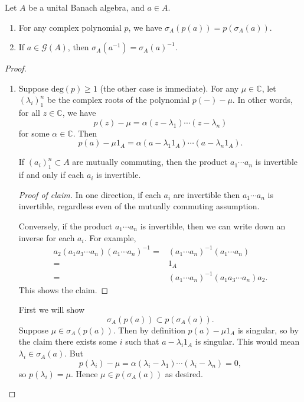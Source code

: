 \documentclass[12pt]{article}
\begin{document}
\begin{proposition}
	Let $A$ be a unital Banach algebra, and $a\in A$.
	\begin{enumerate}
		\item For any complex polynomial $p$, we have $\sigma_A(p(a)) = p(\sigma_A(a))$.
		\item If $a\in\mathcal{G}(A)$, then $\sigma_A(a^{-1}) = \sigma_A(a)^{-1}$.
	\end{enumerate}
\end{proposition}
\begin{proof}
\begin{enumerate}
	\item Suppose $\text{deg}(p)\geq 1$ (the other case is immediate). For any $\mu\in\mathbb{C}$, let $(\lambda_i)_1^n$ be the complex roots of the polynomial $p(-) - \mu$. In other words, for all $z\in\mathbb{C}$, we have 
		\begin{equation*}
			p(z) - \mu = \alpha (z-\lambda_1)\cdots(z-\lambda_n)
		\end{equation*}
		for some $\alpha\in\mathbb{C}$. Then 
		\begin{equation*}
			p(a) - \mu 1_A = \alpha(a-\lambda_1 1_A) \cdots (a - \lambda_n 1_A).
		\end{equation*}

		\begin{claim}
			If $(a_i)_1^n\subset A$ are mutually commuting, then the product $a_1\cdots a_n$ is invertible if and only if each $a_i$ is invertible.
		\end{claim}
		\begin{proof}[Proof of claim] 
			In one direction, if each $a_i$ are invertible then $a_1\cdots a_n$ is invertible, regardless even of the mutually commuting assumption.

			Conversely, if the product $a_1\cdots a_n$ is invertible, then we can write down an inverse for each $a_i$. For example, 
			\begin{align*}
				a_2(a_1a_3\cdots a_n)(a_1\cdots a_n)^{-1}
				=& (a_1\cdots a_n)^{-1}(a_1\cdots a_n) \\
				=& 1_A \\
				=& (a_1\cdots a_n)^{-1} (a_1a_3\cdots a_n)a_2.
			\end{align*}
			This shows the claim.
		\end{proof}

		First we will show 
		\begin{equation*}
			\sigma_A(p(a)) \subset p(\sigma_A(a)).
		\end{equation*}
		Suppose $\mu \in \sigma_A(p(a))$. Then by definition $p(a) - \mu 1_A$ is singular, so by the claim there exists some $i$ such that $a-\lambda_i 1_A$ is singular. This would mean $\lambda_i\in \sigma_A(a)$. But 
		\begin{equation*}
			p(\lambda_i) - \mu = \alpha(\lambda_i-\lambda_1)\cdots (\lambda_i-\lambda_n) = 0,
		\end{equation*}
		so $p(\lambda_i) = \mu$. Hence $\mu\in p(\sigma_A(a))$ as desired.


\end{enumerate}
\end{proof}
\end{document}
